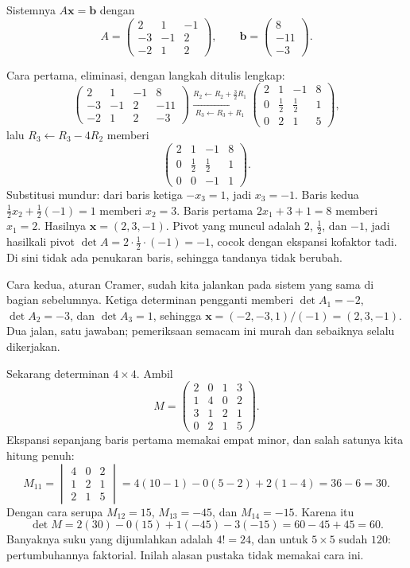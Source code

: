 Sistemnya $A\mathbf{x}=\mathbf{b}$ dengan
\[
  A=\begin{pmatrix}2&1&-1\\ -3&-1&2\\ -2&1&2\end{pmatrix},
  \qquad \mathbf{b}=\begin{pmatrix}8\\ -11\\ -3\end{pmatrix}.
\]

Cara pertama, eliminasi, dengan langkah ditulis lengkap:
\[
  \left(\begin{array}{ccc|c}2&1&-1&8\\ -3&-1&2&-11\\ -2&1&2&-3\end{array}\right)
  \xrightarrow[R_{3}\leftarrow R_{3}+R_{1}]{R_{2}\leftarrow R_{2}+\tfrac{3}{2}R_{1}}
  \left(\begin{array}{ccc|c}2&1&-1&8\\ 0&\tfrac{1}{2}&\tfrac{1}{2}&1\\
  0&2&1&5\end{array}\right),
\]
lalu $R_{3}\leftarrow R_{3}-4R_{2}$ memberi
\[
  \left(\begin{array}{ccc|c}2&1&-1&8\\ 0&\tfrac{1}{2}&\tfrac{1}{2}&1\\
  0&0&-1&1\end{array}\right).
\]
Substitusi mundur: dari baris ketiga $-x_{3}=1$, jadi $x_{3}=-1$. Baris kedua
$\tfrac{1}{2}x_{2}+\tfrac{1}{2}(-1)=1$ memberi $x_{2}=3$. Baris pertama
$2x_{1}+3+1=8$ memberi $x_{1}=2$. Hasilnya $\mathbf{x}=(2,3,-1)$. Pivot yang muncul adalah
$2$, $\tfrac{1}{2}$, dan $-1$, jadi hasilkali pivot $\det A=2\cdot\tfrac{1}{2}\cdot(-1)=-1$,
cocok dengan ekspansi kofaktor tadi. Di sini tidak ada penukaran baris, sehingga tandanya
tidak berubah.

Cara kedua, aturan Cramer, sudah kita jalankan pada sistem yang sama di bagian sebelumnya.
Ketiga determinan pengganti memberi $\det A_{1}=-2$, $\det A_{2}=-3$, dan $\det A_{3}=1$,
sehingga $\mathbf{x}=(-2,-3,1)/(-1)=(2,3,-1)$. Dua jalan, satu jawaban; pemeriksaan semacam
ini murah dan sebaiknya selalu dikerjakan.

Sekarang determinan $4\times4$. Ambil
\[
  M=\begin{pmatrix}2&0&1&3\\ 1&4&0&2\\ 3&1&2&1\\ 0&2&1&5\end{pmatrix}.
\]
Ekspansi sepanjang baris pertama memakai empat minor, dan salah satunya kita hitung penuh:
\[
  M_{11}=\begin{vmatrix}4&0&2\\ 1&2&1\\ 2&1&5\end{vmatrix}
  =4(10-1)-0(5-2)+2(1-4)=36-6=30 .
\]
Dengan cara serupa $M_{12}=15$, $M_{13}=-45$, dan $M_{14}=-15$. Karena itu
\[
  \det M=2(30)-0(15)+1(-45)-3(-15)=60-45+45=60 .
\]
Banyaknya suku yang dijumlahkan adalah $4!=24$, dan untuk $5\times5$ sudah $120$:
pertumbuhannya faktorial. Inilah alasan pustaka tidak memakai cara ini.

